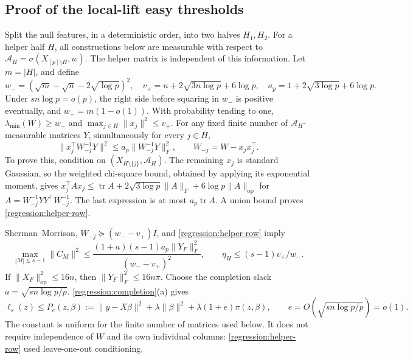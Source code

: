 \subsection{Proof of the local-lift easy thresholds}
\label{app:regression:lift-easy}

Split the null features, in a deterministic order, into two halves
$H_1,H_2$. For a helper half $H$, all constructions below are
measurable with respect to $\mathcal A_H=\sigma(X_{[p]\setminus H},w)$.
The helper matrix is independent of this information.
Let $m=|H|$, and define
\[
 w_-=(\sqrt m-\sqrt n-2\sqrt{\log p})^2,\quad
 v_+=n+2\sqrt{3n\log p}+6\log p,\quad
 a_p=1+2\sqrt{3\log p}+6\log p .
\]
Under $s n\log p=o(p)$, the right side before squaring in $w_-$
is positive eventually, and $w_-=m(1-o(1))$.
With probability tending to one,
$\lambda_{\min}(W)\geq w_-$ and $\max_{j\in H}\|x_j\|^2\leq v_+$.
For any fixed finite number of $\mathcal A_H$-measurable matrices $Y$,
simultaneously for every $j\in H$,
\begin{equation}\label{regression:helper-row}
 \|x_j^\top W_{-j}^{-1}Y\|^2
       \leq a_p\|W_{-j}^{-1}Y\|_F^2,\qquad
 W_{-j}=W-x_jx_j^\top .
\end{equation}
To prove this, condition on $(X_{H\setminus\{j\}},\mathcal A_H)$.
The remaining $x_j$ is standard Gaussian, so the weighted
chi-square bound, obtained by applying its exponential moment,
gives
$x_j^\top A x_j\leq\operatorname{tr}A+
2\sqrt{3\log p}\|A\|_F+6\log p\|A\|_{\mathrm{op}}$
for $A=W_{-j}^{-1}YY^\top W_{-j}^{-1}$.
The last expression is at most $a_p\operatorname{tr}A$.
A union bound proves \eqref{regression:helper-row}.

Sherman--Morrison, $W_{-j}\succeq(w_--v_+)I$, and
\eqref{regression:helper-row} imply
\[
 \max_{|M|\leq s-1}\|C_M\|^2
 \leq\frac{(1+a)(s-1)a_p\|Y_F\|_F^2}{(w_--v_+)^2},
 \qquad \eta_H\leq(s-1)v_+/w_- .
\]
If $\|X_F\|_{\mathrm{op}}^2\leq16n$, then
$\|Y_F\|_F^2\leq16n\pi$.
Choose the completion slack $a=\sqrt{s n\log p/p}$.
\cref{regression:completion}(a) gives
\begin{equation}\label{regression:inflation}
 \ell_s(z)\leq P_e(z,\beta):=
 \|y-X\beta\|^2+\lambda\|\beta\|^2+\lambda(1+e)\pi(z,\beta),
 \qquad e=O(\sqrt{s n\log p/p})=o(1).
\end{equation}
The constant is uniform for the finite number of matrices used
below. It does not require independence of $W$ and its own
individual columns: \eqref{regression:helper-row} used leave-one-out
conditioning.

